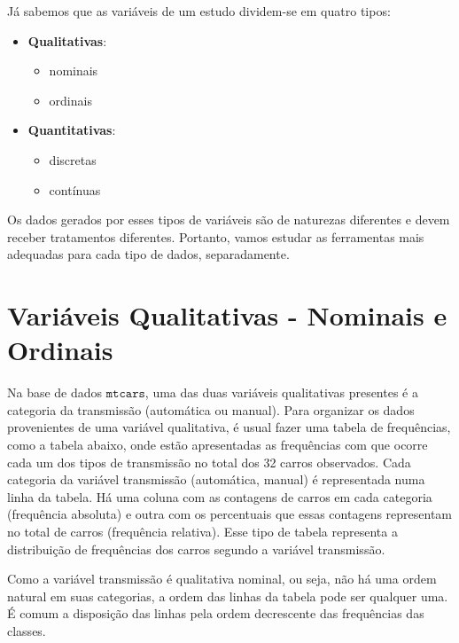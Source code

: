 \documentclass[
]{book}
\providecommand{\tightlist}{%
  \setlength{\itemsep}{0pt}\setlength{\parskip}{0pt}}
\begin{document}
Já sabemos que as variáveis de um estudo dividem-se em quatro tipos:

\begin{itemize}
\tightlist
\item
  \textbf{Qualitativas}:

  \begin{itemize}
  \tightlist
  \item
    nominais
  \item
    ordinais
  \end{itemize}
\item
  \textbf{Quantitativas}:

  \begin{itemize}
  \tightlist
  \item
    discretas
  \item
    contínuas
  \end{itemize}
\end{itemize}

Os dados gerados por esses tipos de variáveis são de naturezas diferentes e devem receber tratamentos diferentes. Portanto, vamos estudar as ferramentas mais adequadas para cada tipo de dados, separadamente.

\hypertarget{variuxe1veis-qualitativas---nominais-e-ordinais}{%
\section{Variáveis Qualitativas - Nominais e Ordinais}\label{variuxe1veis-qualitativas---nominais-e-ordinais}}

Na base de dados \(\texttt{mtcars}\), uma das duas variáveis qualitativas presentes é a categoria da transmissão (automática ou manual). Para organizar os dados provenientes de uma variável qualitativa, é usual fazer uma tabela de frequências, como a tabela abaixo, onde estão apresentadas as frequências com que ocorre cada um dos tipos de transmissão no total dos 32 carros observados. Cada categoria da variável transmissão (automática, manual) é representada numa linha da tabela. Há uma coluna com as contagens de carros em cada categoria (frequência absoluta) e outra com os percentuais que essas contagens representam no total de carros (frequência relativa). Esse tipo de tabela representa a distribuição de frequências dos carros segundo a variável transmissão.

Como a variável transmissão é qualitativa nominal, ou seja, não há uma ordem natural em suas categorias, a ordem das linhas da tabela pode ser qualquer uma. É comum a disposição das linhas pela ordem decrescente das frequências das classes.
\end{document}

